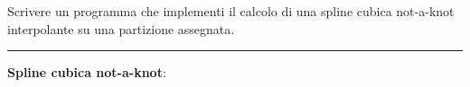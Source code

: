 Scrivere un programma che implementi il calcolo di una spline cubica not-a-knot interpolante su una partizione assegnata.

\hspace*{\fill}
\par\noindent\rule{\textwidth}{0.4pt}
\hspace*{\fill}

\textbf{Spline cubica not-a-knot}:

